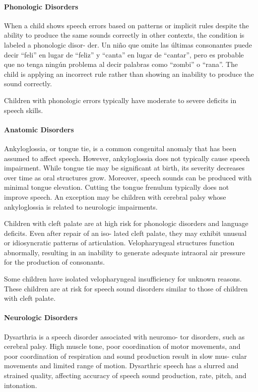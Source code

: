 \paragraph{Phonologic Disorders}
When a child shows speech errors based on patterns or implicit
rules despite the ability to produce the same sounds correctly
in other contexts, the condition is labeled a phonologic disor-
der. Un niño que omite las
últimas consonantes puede decir ``feli'' en lugar de ``feliz'' y ``canta'' en lugar
de ``cantar'', pero es probable que no tenga ningún problema al decir palabras
como ``zombi'' o ``rana''. The child is applying an
incorrect rule rather than showing an inability to produce the sound
correctly. \cite{Feldman44}

Children with phonologic errors typically
have moderate to severe deficits in speech skills. 

\paragraph{Anatomic Disorders}
Ankyloglossia, or tongue tie, is a common congenital anomaly that has been
assumed to affect speech. However, ankyloglossia does not typically cause
speech impairment. While
tongue tie may be significant at birth, its severity decreases
over time as oral structures grow. Moreover, speech sounds
can be produced with minimal tongue elevation. Cutting
the tongue frenulum typically does not improve speech. An
exception may be children with cerebral palsy whose ankyloglossia is related to
neurologic impairments. \cite{Feldman44}

Children with cleft palate are at high risk for phonologic
disorders and language deficits. Even after repair of an iso-
lated cleft palate, they may exhibit unusual or idiosyncratic
patterns of articulation. Velopharyngeal structures function
abnormally, resulting in an inability to generate adequate
intraoral air pressure for the production of consonants. \cite{Feldman44}

Some children have isolated velopharyngeal insufficiency
for unknown reasons. These children are at risk for speech
sound disorders similar to those of children with cleft palate. \cite{Feldman44}

\paragraph{Neurologic Disorders}
Dysarthria is a speech disorder associated with neuromo-
tor disorders, such as cerebral palsy. High muscle tone, poor
coordination of motor movements, and poor coordination
of respiration and sound production result in slow mus-
cular movements and limited range of motion. Dysarthric
speech has a slurred and strained quality, affecting accuracy
of speech sound production, rate, pitch, and intonation. \cite{Feldman44}

